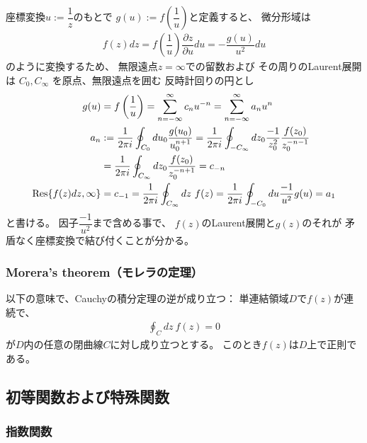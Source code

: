 座標変換$u := \dfrac{1}{z}$のもとで
$    g(u)
:=
    f
    \left( \dfrac{1}{u} \right)
$と定義すると、
微分形域は
\begin{align}
    f(z) dz
    =
    f
    \left( \dfrac{1}{u} \right)
    \dfrac{\partial z}{\partial u}
    du
    =
    - \dfrac{ g (u) }{u^2}
    du
\end{align}
のように変換するため、
無限遠点$z = \infty$での留数および
その周りのLaurent展開は
$C_{0}, C_{\infty}$
を原点、無限遠点を囲む
反時計回りの円とし
\begin{subequations}
\begin{align}
    g(u)
&=
    f
    \left( \dfrac{1}{u} \right)
=
    \sum_{n=-\infty}^{\infty}
        c_{n} u^{-n}
=
    \sum_{n=-\infty}^{\infty}
        a_n u^n
\\
    a_n
    &:= \dfrac{1}{2 \pi i}
    \oint_{C_0} du_0 \dfrac{g(u_0)}{u_0^{n+1}}
=
    \dfrac{1}{2 \pi i}
    \oint_{- C_\infty}
        dz_0
        \dfrac{- 1}{z_0^2}
        \dfrac{
            f ( z_0 )
        }{z_0^{-n-1}}
\notag\\&
=
    \dfrac{1}{2 \pi i}
    \oint_{C_\infty}
        dz_0
        \dfrac{
            f ( z_0 )
        }{z_0^{-n+1}}
    = c_{-n}
\\
    \Res{f(z)dz, \infty}
& = c_{-1} =
    \dfrac{1}{2 \pi i}
    \oint_{C_{\infty}} dz\ f(z)
=
    \dfrac{1}{2 \pi i}
    \oint_{- C_{0}} du
    \dfrac{ -1 }{u^2}
    g(u)
=   a_1
\end{align}
\end{subequations}
と書ける。
因子$\dfrac{-1}{u^2}$まで含める事で、
$f(z)$のLaurent展開と$g(z)$のそれが
矛盾なく座標変換で結び付くことが分かる。

\subsubsection{Morera's theorem（モレラの定理）}

以下の意味で、Cauchyの積分定理の逆が成り立つ：
単連結領域$D$で$f(z)$が連続で、
\begin{align}
    \oint_C dz\ f(z) = 0
\end{align}
が$D$内の任意の閉曲線$C$に対し成り立つとする。
このとき$f(z)$は$D$上で正則である。

\newpage
\subsection{初等関数および特殊関数}

\subsubsection{指数関数}

